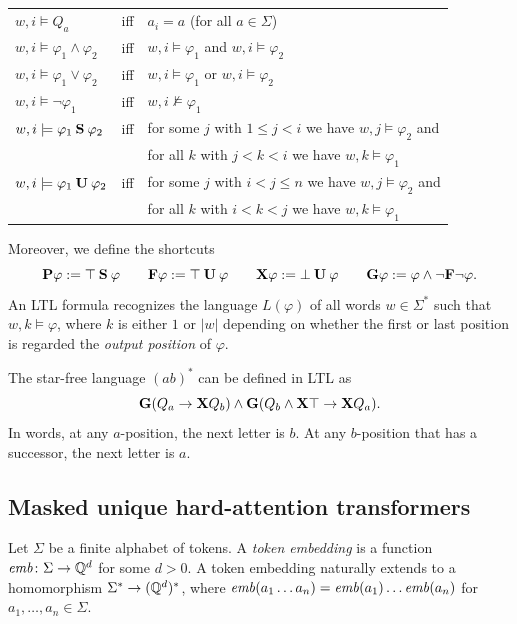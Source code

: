\begin{center}
\begin{tabular}{l l l}
$w,i \models Q_a$ & iff & $a_i = a$ \qquad (for all $a \in \Sigma$)\\
$w,i \models \varphi_1 \wedge \varphi_2$ & iff & $w,i \models \varphi_1$ and $w,i \models \varphi_2$\\
$w,i \models \varphi_1 \vee \varphi_2$ & iff & $w,i \models \varphi_1$ or $w,i \models \varphi_2$\\
$w,i \models \neg\varphi_1$ & iff & $w,i \not\models \varphi_1$\\
$w,i \models \varphi_1 \mathbin{\textbf{S}} \varphi_2$ & iff & for some $j$ with $1 \le j < i$ we have $w,j \models \varphi_2$ and \\
&& for all $k$ with $j < k < i$ we have $w,k \models \varphi_1$\\
$w,i \models \varphi_1 \mathbin{\textbf{U}} \varphi_2$ & iff & for some $j$ with $i < j \le n$ we have $w,j \models \varphi_2$ and \\
&& for all $k$ with $i < k < j$ we have $w,k \models \varphi_1$
\end{tabular}
\end{center}

Moreover, we define the shortcuts 
\[\textbf{P}\varphi := \top \mathbin{\textbf{S}} \varphi \qquad \textbf{F}\varphi := \top \mathbin{\textbf{U}} \varphi \qquad
\textbf{X}\varphi := \bot \mathbin{\textbf{U}} \varphi \qquad \textbf{G}\varphi := \varphi \wedge \neg\textbf{F}\neg\varphi.\]
An LTL formula recognizes the language $L(\varphi)$ of all words $w \in \Sigma^*$ such that $w,k \models \varphi$,
where $k$ is either $1$ or $|w|$ depending on whether the first or last position 
is regarded the \emph{output position} of $\varphi$.

\begin{example}
    The star-free language $(ab)^*$ can be defined in LTL as
    \[
        \textbf{G}( Q_a \to \textbf{X} Q_b ) \wedge \textbf{G}( Q_b \wedge \textbf{X} \top \to \textbf{X} Q_a
        ).
    \]
    In words, at any $a$-position, the next letter is $b$. At any $b$-position
    that has a successor, the next letter is $a$.
\end{example}

\subsection{Masked unique hard-attention transformers}
Let $\Sigma$ be a finite alphabet of tokens.
A \emph{token embedding} is a function $\mathit{emb} \colon \Sigma \to \mathbb{Q}^d$ for some $d > 0$.
A token embedding naturally extends to a homomorphism $\Sigma^* \to (\mathbb{Q}^d)^*$, 
where $\mathit{emb}(a_1\dots a_n) = \mathit{emb}(a_1)\dots\mathit{emb}(a_n)$ for $a_1,\dots,a_n \in \Sigma$.

